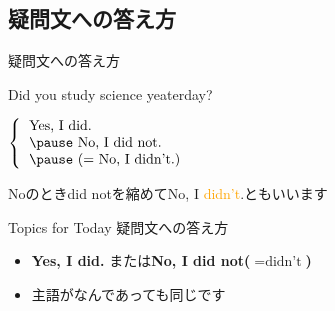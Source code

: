 \documentclass[aspectratio=169,xcolor={dvipsnames,table}]{beamer}
\newcommand{\myaudio}[1]{\href{#1}{\faVolumeUp}}
\begin{document}
\subsection{疑問文への答え方}
 \begin{frame}[plain]{疑問文への答え方}
 \Large
\pause

Did  you study science yeaterday?

\vspace{20pt}
\pause

\mbox{}\hspace{100pt}$\left\{\begin{tabular}{l}
         \text{Yes, I did.}\\\pause
         \text{No, I did not.}\\\pause
         \text{(}= \text{No, I didn't.)}
        \end{tabular}\right.$

\pause

\mbox{}\hfill{}{\small Noのときdid notを縮めてNo, I \textcolor{orange}{didn't}.ともいいます}\,\,\myaudio{./audio/027_past_did_you_03.mp3}

\begin{exampleblock}{Topics for Today}
\small
疑問文への答え方
\begin{itemize}
 \item  \textcolor{NavyBlue}{\bfseries Yes, I did.} または\textcolor{NavyBlue}{\bfseries No, I did not($=\text{didn't}$)}
 \item  主語がなんであっても同じです
\end{itemize}
      \end{exampleblock}

\end{frame}
\end{document}
